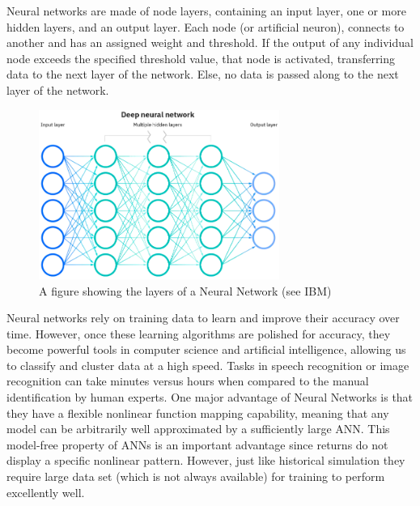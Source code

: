 \documentclass[a4paper,11pt,oneside]{book}
\begin{document}
Neural networks are made of node layers, containing an input layer, one or more hidden layers, and an output layer. Each node (or artificial neuron), connects to another and has an assigned weight and threshold. If the output of any individual node exceeds the specified threshold value, that node is activated, transferring data to the next layer of the network. Else, no data is passed along to the next layer of the network.
\begin{figure}[!h]
	\centering
	\includegraphics[width=0.7\textwidth]{figures/NN}
	\caption{A figure showing the layers of a Neural Network (see IBM)}
	\label{firstfig}
\end{figure}\newline
Neural networks rely on training data to learn and improve their accuracy over time. However, once these learning algorithms are polished for accuracy, they become powerful tools in computer science and artificial intelligence, allowing us to classify and cluster data at a high speed. Tasks in speech recognition or image recognition can take minutes versus hours when compared to the manual identification by human experts.
\newline\newline
One major advantage of Neural Networks is that they have a flexible nonlinear
function mapping capability, meaning that any model can be arbitrarily well
approximated by a sufficiently large ANN. This model-free property of ANNs is an
important advantage since returns do not display a specific nonlinear pattern. However, just like historical simulation they require large data set (which is not always available) for training to perform excellently well.




\end{document}
